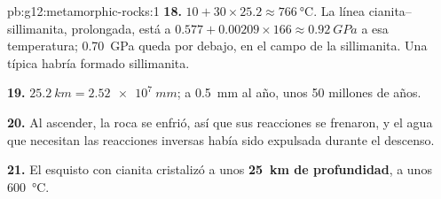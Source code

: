 \begin{solution}{pb:g12:metamorphic-rocks:1}
\textbf{18.} $10 + 30 \times 25.2 \approx \qty{766}{\celsius}$. La línea
cianita--sillimanita, prolongada, está a $0.577 + 0.00209 \times 166
\approx \qty{0.92}{GPa}$ a esa temperatura; \qty{0.70}{GPa} queda por debajo,
en el campo de la sillimanita. Una  típica habría formado sillimanita.

\textbf{19.} $\qty{25.2}{km} = \qty{2.52e7}{mm}$; a \qty{0.5}{mm} al año,
unos 50 millones de años.

\textbf{20.} Al ascender, la roca se enfrió, así que sus reacciones se
frenaron, y el agua que necesitan las reacciones inversas había sido
expulsada durante el descenso.

\textbf{21.} El esquisto con cianita cristalizó a unos \textbf{\qty{25}{km}
de profundidad}, a unos \qty{600}{\celsius}.
\end{solution}

